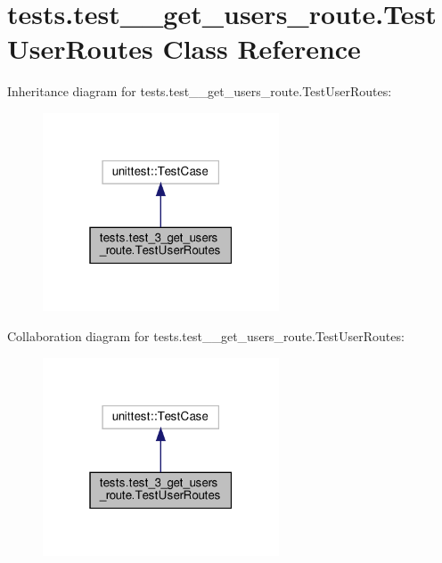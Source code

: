 \hypertarget{classtests_1_1test__3__get__users__route_1_1_test_user_routes}{}\section{tests.\+test\+\_\+\_\+get\+\_\+users\+\_\+route.\+Test\+User\+Routes Class Reference}
\label{classtests_1_1test__3__get__users__route_1_1_test_user_routes}


Inheritance diagram for tests.\+test\+\_\+\_\+get\+\_\+users\+\_\+route.\+Test\+User\+Routes\+:\nopagebreak
\begin{figure}[H]
\begin{center}
\leavevmode
\includegraphics[width=199pt]{classtests_1_1test__3__get__users__route_1_1_test_user_routes__inherit__graph}
\end{center}
\end{figure}


Collaboration diagram for tests.\+test\+\_\+\_\+get\+\_\+users\+\_\+route.\+Test\+User\+Routes\+:\nopagebreak
\begin{figure}[H]
\begin{center}
\leavevmode
\includegraphics[width=199pt]{classtests_1_1test__3__get__users__route_1_1_test_user_routes__coll__graph}
\end{center}
\end{figure}
